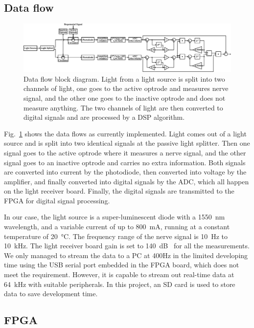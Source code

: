 \subsection{Data flow}

\begin{figure}[h]
\centerline{\includegraphics[width=1\linewidth]{4-ANC_Sys/DataFlow.pdf}}
\caption{Data flow block diagram.  Light from a light source is split into two channels of light, one goes to the active optrode and measures nerve signal, and the other one goes to the inactive optrode and does not measure anything.  The two channels of light are then converted to digital signals and are processed by a DSP algorithm.}
\label{fig_DataFlow}
\end{figure}

Fig.~\ref{fig_DataFlow} shows the data flows as currently implemented.  Light comes out of a light source and is split into two identical signals at the passive light splitter.  Then one signal goes to the active optrode where it measures a nerve signal, and the other signal goes to an inactive optrode and carries no extra information.  Both signals are converted into current by the photodiode, then converted into voltage by the amplifier, and finally converted into digital signals by the ADC, which all happen on the light receiver board.  Finally, the digital signals are transmitted to the FPGA for digital signal processing.

In our case, the light source is a super-luminescent diode with a \qty{1550}{\nm} wavelength, and a variable current of up to \qty{800}{\mA}, running at a constant temperature of \qty{20}{\degreeCelsius}.  The frequency range of the nerve signal is \qty{10}{\Hz} to \qty{10}{\kHz}.  The light receiver board gain is set to \qty{140}{dB\Omega} for all the measurements.  We only managed to stream the data to a PC at 400Hz in the limited developing time using the USB serial port embedded in the FPGA board, which does not meet the requirement.  However, it is capable to stream out real-time data at \qty{64}{kHz} with suitable peripherals.  In this project, an SD card is used to store data to save development time.


\subsection{FPGA}

